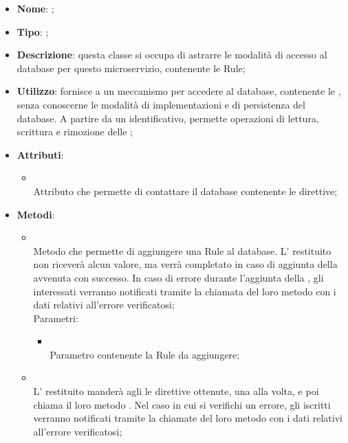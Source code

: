 \begin{itemize}
	\item \textbf{Nome}: ;
	\item \textbf{Tipo}: ;
	\item \textbf{Descrizione}: questa classe si occupa di astrarre le modalità di accesso al database per questo microservizio, contenente le Rule;
	\item \textbf{Utilizzo}: fornisce a  un meccanismo per accedere al database, contenente le , senza conoscerne le modalità di implementazioni e di persistenza del database. A partire da un identificativo, permette operazioni di lettura, scrittura e rimozione delle ;
	\item \textbf{Attributi}:
	\begin{itemize}
		\item[]  \\
		Attributo che permette di contattare  il database contenente le direttive;
	\end{itemize}
	\item \textbf{Metodi}:
	\begin{itemize}
		\item[]  \\
		Metodo che permette di aggiungere una Rule al database.  L' restituito non riceverà alcun valore, ma verrà completato in caso di aggiunta della  avvenuta con successo. In caso di errore durante l'aggiunta della , gli  interessati verranno notificati tramite la chiamata del loro metodo  con i dati relativi all'errore verificatosi;\\
		Parametri:
		\begin{itemize}
			\item {} \\
			Parametro contenente la Rule da aggiungere;
		\end{itemize}
		\item[]  \\
		L' restituito manderà agli  le direttive ottenute, una alla volta, e poi chiama il loro metodo . Nel caso in cui si verifichi un errore, gli  iscritti verranno notificati tramite la chiamate del loro metodo  con i dati relativi all'errore verificatosi;\\

\end{itemize}
\end{itemize}
